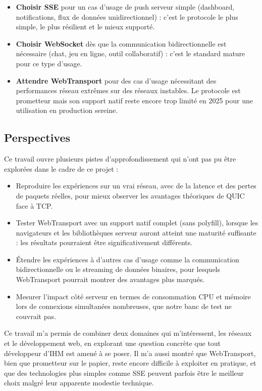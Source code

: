\begin{itemize}
    \item \textbf{Choisir SSE} pour un cas d'usage de push serveur simple (dashboard, notifications, flux de données unidirectionnel) : c'est le protocole le plus simple, le plus résilient et le mieux supporté.
    \item \textbf{Choisir WebSocket} dès que la communication bidirectionnelle est nécessaire (chat, jeu en ligne, outil collaboratif) : c'est le standard mature pour ce type d'usage.
    \item \textbf{Attendre WebTransport} pour des cas d'usage nécessitant des performances réseau extrêmes sur des réseaux instables. Le protocole est prometteur mais son support natif reste encore trop limité en 2025 pour une utilisation en production sereine.
\end{itemize}

\subsection{Perspectives}

Ce travail ouvre plusieurs pistes d'approfondissement qui n'ont pas pu être explorées dans le cadre de ce projet :

\begin{itemize}
    \item Reproduire les expériences sur un vrai réseau, avec de la latence et des pertes de paquets réelles, pour mieux observer les avantages théoriques de QUIC face à TCP.
    \item Tester WebTransport avec un support natif complet (sans polyfill), lorsque les navigateurs et les bibliothèques serveur auront atteint une maturité suffisante : les résultats pourraient être significativement différents.
    \item Étendre les expériences à d'autres cas d'usage comme la communication bidirectionnelle ou le streaming de données binaires, pour lesquels WebTransport pourrait montrer des avantages plus marqués.
    \item Mesurer l'impact côté serveur en termes de consommation CPU et mémoire lors de connexions simultanées nombreuses, que notre banc de test ne couvrait pas.
\end{itemize}

Ce travail m'a permis de combiner deux domaines qui m'intéressent, les réseaux et le développement web, en explorant une question concrète que tout développeur d'IHM est amené à se poser. Il m'a aussi montré que WebTransport, bien que prometteur sur le papier, reste encore difficile à exploiter en pratique, et que des technologies plus simples comme SSE peuvent parfois être le meilleur choix malgré leur apparente modestie technique.

